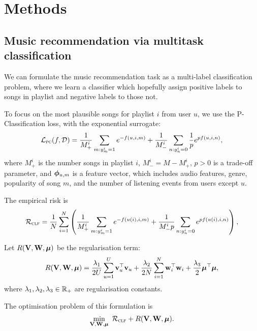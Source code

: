 \section{Methods}

\subsection{Music recommendation via multitask classification}

We can formulate the music recommendation task as a multi-label classification problem,
where we learn a classifier which hopefully assign positive labels to songs in playlist and negative labels to those not.

To focus on the most plausible songs for playlist $i$ from user $u$,
we use the P-Classification loss, with the exponential surrogate:
\begin{equation*}
\begin{aligned}
\mathcal{L}_\textsc{pc}(f, \mathcal{D}) 
&= \frac{1}{M_+^i} \sum_{m: y_m^i = 1} e^{-f(u, i, m)} + \frac{1}{M_-^i} \sum_{n: y_n^i = 0} \frac{1}{p} e^{p f(u, i, n)}, \\
\end{aligned}
\end{equation*}
where $M_+^i$ is the number songs in playlist $i$,
$M_-^i = M - M_+^i$,
$p > 0$ is a trade-off parameter,
and $\bm{\phi}_{u,m}$ is a feature vector,
which includes audio features, genre, popularity of song $m$,
and the number of listening events from users except $u$.

The empirical risk is
$$
\mathcal{R}_\textsc{clf} 
= \frac{1}{N} \sum_{i=1}^N \left( \frac{1}{M_+^i} \sum_{m: y_m^i = 1} e^{-f(u(i), i,m)} 
  + \frac{1}{M_-^i p} \sum_{n: y_n^i = 0} e^{p f(u(i), i,n)} \right),
$$

Let $R(\mathbf{V}, \mathbf{W}, \bm{\mu})$ be the regularisation term:
$$
R(\mathbf{V}, \mathbf{W}, \bm{\mu}) 
= \frac{\lambda_1}{2U} \sum_{u=1}^U \mathbf{v}_u^\top \mathbf{v}_u + \frac{\lambda_2}{2N} \sum_{i=1}^N \mathbf{w}_i^\top \mathbf{w}_i + \frac{\lambda_3}{2} \bm{\mu}^\top \bm{\mu},
$$
where $\lambda_1, \lambda_2, \lambda_3 \in \mathbb{R}_+$ are regularisation constants.

The optimisation problem of this formulation is
\begin{equation*}
\begin{aligned}
\min_{\mathbf{V}, \mathbf{W}, \bm{\mu}} \ \mathcal{R}_\textsc{clf} + R(\mathbf{V}, \mathbf{W}, \bm{\mu}).
\end{aligned}
\end{equation*}
